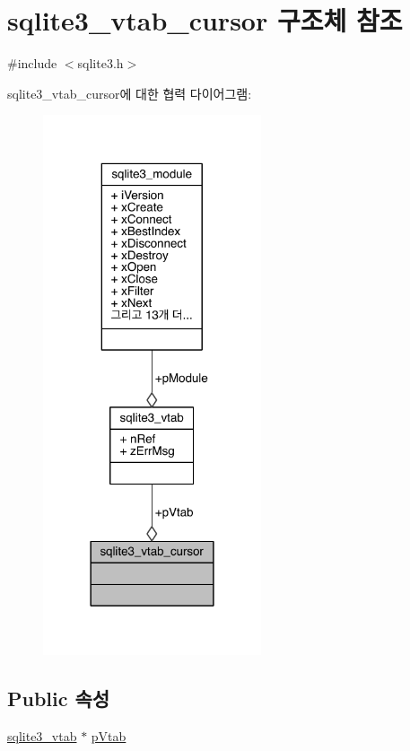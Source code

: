 \hypertarget{structsqlite3__vtab__cursor}{}\section{sqlite3\+\_\+vtab\+\_\+cursor 구조체 참조}
\label{structsqlite3__vtab__cursor}


{\ttfamily \#include $<$sqlite3.\+h$>$}



sqlite3\+\_\+vtab\+\_\+cursor에 대한 협력 다이어그램\+:
\nopagebreak
\begin{figure}[H]
\begin{center}
\leavevmode
\includegraphics[width=182pt]{structsqlite3__vtab__cursor__coll__graph}
\end{center}
\end{figure}
\subsection*{Public 속성}
\begin{DoxyCompactItemize}
\item 
\hyperlink{structsqlite3__vtab}{sqlite3\+\_\+vtab} $\ast$ \hyperlink{structsqlite3__vtab__cursor_a2989d9f84a35506c3ef9fe9e9ecd3365}{p\+Vtab}
\end{DoxyCompactItemize}


